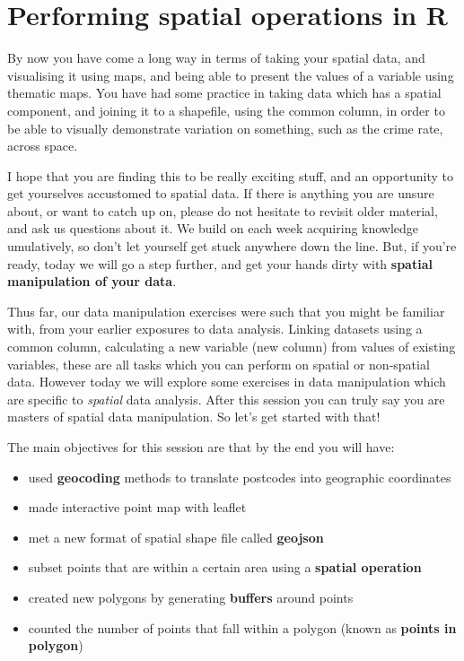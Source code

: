 \documentclass[]{book}
\providecommand{\tightlist}{%
  \setlength{\itemsep}{0pt}\setlength{\parskip}{0pt}}
\begin{document}
\hypertarget{performing-spatial-operations-in-r}{%
\chapter{Performing spatial operations in R}\label{performing-spatial-operations-in-r}}

By now you have come a long way in terms of taking your spatial data, and visualising it using maps, and being able to present the values of a variable using thematic maps. You have had some practice in taking data which has a spatial component, and joining it to a shapefile, using the common column, in order to be able to visually demonstrate variation on something, such as the crime rate, across space.

I hope that you are finding this to be really exciting stuff, and an opportunity to get yourselves accustomed to spatial data. If there is anything you are unsure about, or want to catch up on, please do not hesitate to revisit older material, and ask us questions about it. We build on each week acquiring knowledge umulatively, so don't let yourself get stuck anywhere down the line. But, if you're ready, today we will go a step further, and get your hands dirty with \textbf{spatial manipulation of your data}.

Thus far, our data manipulation exercises were such that you might be familiar with, from your earlier exposures to data analysis. Linking datasets using a common column, calculating a new variable (new column) from values of existing variables, these are all tasks which you can perform on spatial or non-spatial data. However today we will explore some exercises in data manipulation which are specific to \emph{spatial} data analysis. After this session you can truly say you are masters of spatial data manipulation. So let's get started with that!

The main objectives for this session are that by the end you will have:

\begin{itemize}
\tightlist
\item
  used \textbf{geocoding} methods to translate postcodes into geographic coordinates
\item
  made interactive point map with leaflet
\item
  met a new format of spatial shape file called \textbf{geojson}
\item
  subset points that are within a certain area using a \textbf{spatial operation}
\item
  created new polygons by generating \textbf{buffers} around points
\item
  counted the number of points that fall within a polygon (known as \textbf{points in polygon})
\end{itemize}
\end{document}
